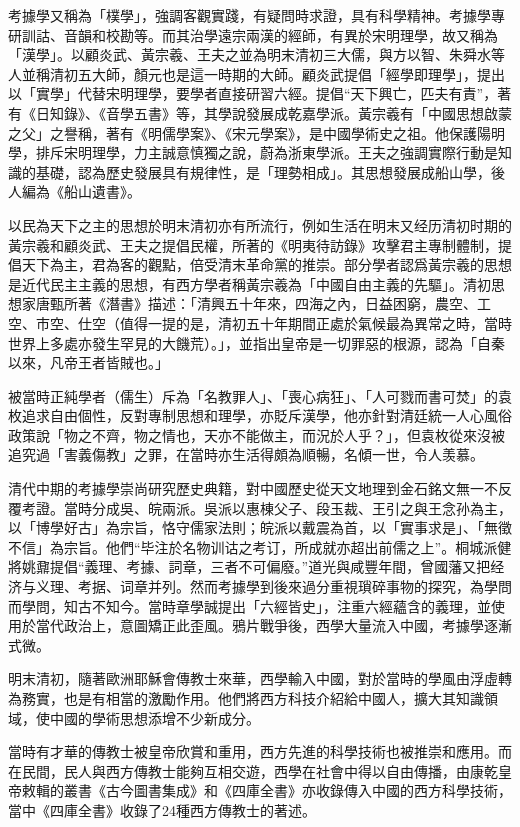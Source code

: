 考據學又稱為「樸學」，強調客觀實踐，有疑問時求證，具有科學精神。考據學專研訓詁、音韻和校勘等。而其治學遠宗兩漢的經師，有異於宋明理學，故又稱為「漢學」。以顧炎武、黃宗羲、王夫之並為明末清初三大儒，與方以智、朱舜水等人並稱清初五大師，顏元也是這一時期的大師。顧炎武提倡「經學即理學」，提出以「實學」代替宋明理學，要學者直接研習六經。提倡“天下興亡，匹夫有責”，著有《日知錄》、《音學五書》等，其學說發展成乾嘉學派。黃宗羲有「中國思想啟蒙之父」之譽稱，著有《明儒學案》、《宋元學案》，是中國學術史之祖。他保護陽明學，排斥宋明理學，力主誠意慎獨之說，蔚為浙東學派。王夫之強調實際行動是知識的基礎，認為歷史發展具有規律性，是「理勢相成」。其思想發展成船山學，後人編為《船山遺書》。

以民為天下之主的思想於明末清初亦有所流行，例如生活在明末又经历清初时期的黃宗羲和顧炎武、王夫之提倡民權，所著的《明夷待訪錄》攻擊君主專制體制，提倡天下為主，君為客的觀點，倍受清末革命黨的推崇。部分學者認爲黃宗羲的思想是近代民主主義的思想，有西方學者稱黃宗羲為「中國自由主義的先驅」。清初思想家唐甄所著《潛書》描述：「清興五十年來，四海之內，日益困窮，農空、工空、市空、仕空（值得一提的是，清初五十年期間正處於氣候最為異常之時，當時世界上多處亦發生罕見的大饑荒）。」，並指出皇帝是一切罪惡的根源，認為「自秦以來，凡帝王者皆賊也。」

被當時正純學者（儒生）斥為「名教罪人」、「喪心病狂」、「人可戮而書可焚」的袁枚追求自由個性，反對專制思想和理學，亦貶斥漢學，他亦針對清廷統一人心風俗政策說「物之不齊，物之情也，天亦不能做主，而況於人乎？」，但袁枚從來沒被追究過「害義傷教」之罪，在當時亦生活得頗為順暢，名傾一世，令人羡慕。

清代中期的考據學崇尚研究歷史典籍，對中國歷史從天文地理到金石銘文無一不反覆考證。當時分成吳、皖兩派。吳派以惠棟父子、段玉裁、王引之與王念孙為主，以「博學好古」為宗旨，恪守儒家法則；皖派以戴震為首，以「實事求是」、「無徵不信」為宗旨。他們“毕注於名物训诂之考订，所成就亦超出前儒之上”。桐城派健將姚鼐提倡“義理、考據、詞章，三者不可偏廢。”道光與咸豐年間，曾國藩又把经济与义理、考据、词章并列。然而考據學到後來過分重視瑣碎事物的探究，為學問而學問，知古不知今。當時章學誠提出「六經皆史」，注重六經蘊含的義理，並使用於當代政治上，意圖矯正此歪風。鴉片戰爭後，西學大量流入中國，考據學逐漸式微。

明末清初，隨著歐洲耶穌會傳教士來華，西學輸入中國，對於當時的學風由浮虛轉為務實，也是有相當的激勵作用。他們將西方科技介紹給中國人，擴大其知識領域，使中國的學術思想添增不少新成分。

當時有才華的傳教士被皇帝欣賞和重用，西方先進的科學技術也被推崇和應用。而在民間，民人與西方傳教士能夠互相交遊，西學在社會中得以自由傳播，由康乾皇帝敕輯的叢書《古今圖書集成》和《四庫全書》亦收錄傳入中國的西方科學技術，當中《四庫全書》收錄了24種西方傳教士的著述。

